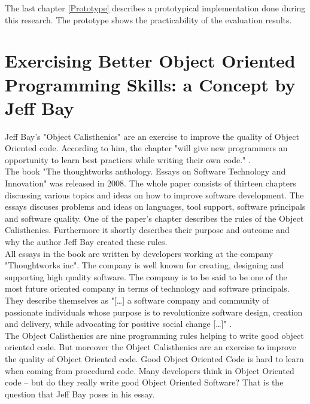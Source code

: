 The last chapter \ref{Prototype} describes a prototypical implementation done during this research. The prototype shows the practicability of the evaluation results.

\section{Exercising Better Object Oriented Programming Skills: a Concept by Jeff Bay}
\label{i:exercising}
Jeff Bay's "Object Calisthenics" \cite{bay2008} are an exercise to improve the quality of Object Oriented code. According to him, the chapter "will give new programmers an opportunity to learn best practices while writing their own code." \cite[p. 70]{bay2008}.\\

The book "The thoughtworks anthology. Essays on Software Technology and Innovation"\cite[p. 70-79]{oc2008} was released in 2008. The whole paper consists of thirteen chapters discussing various topics and ideas on how to improve software development. The essays discuses problems and ideas on languages, tool support, software principals and software quality. One of the paper's chapter describes the rules of the Object Calisthenics. Furthermore it shortly describes their purpose and outcome and why the author Jeff Bay created these rules.\\

All essays in the book \cite{oc2008} are written by developers working at the company "Thoughtworks inc". The company is well known for creating, designing and supporting high quality software. The company is to be said to be one of the most future oriented company in terms of technology and software principals. They describe themselves as "[\dots] a software company and community of passionate individuals whose purpose is to revolutionize software design, creation and delivery, while advocating for positive social change [\dots]" \cite{twWeb}.\\

The Object Calisthenics are nine programming rules helping to write good object oriented code. But moreover the Object Calisthenics are an exercise to improve the quality of Object Oriented code. Good Object Oriented Code is hard to learn when coming from procedural code. Many developers think in Object Oriented code – but do they really write good Object Oriented Software? That is the question that Jeff Bay poses in his essay. 

